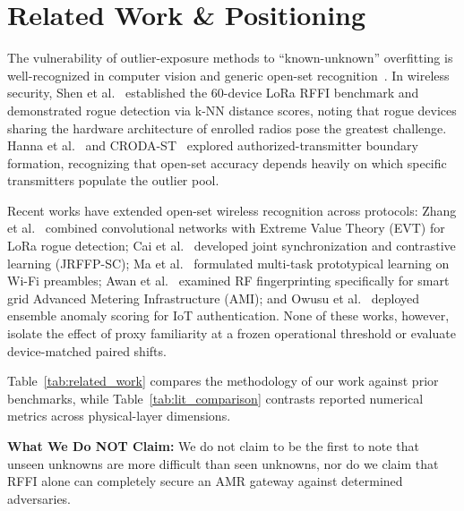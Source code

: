 \documentclass[conference]{IEEEtran}
\begin{document}
\section{Related Work \& Positioning}
The vulnerability of outlier-exposure methods to ``known-unknown'' overfitting is well-recognized in computer vision and generic open-set recognition~\cite{kong2021opengan,koch2023lord}. In wireless security, Shen et al.~\cite{shen2022lora} established the 60-device LoRa RFFI benchmark and demonstrated rogue detection via k-NN distance scores, noting that rogue devices sharing the hardware architecture of enrolled radios pose the greatest challenge. Hanna et al.~\cite{hanna2021open} and CRODA-ST~\cite{crodast2026} explored authorized-transmitter boundary formation, recognizing that open-set accuracy depends heavily on which specific transmitters populate the outlier pool.

Recent works have extended open-set wireless recognition across protocols: Zhang et al.~\cite{zhang2024lora} combined convolutional networks with Extreme Value Theory (EVT) for LoRa rogue detection; Cai et al.~\cite{cai2025jrffp} developed joint synchronization and contrastive learning (JRFFP-SC); Ma et al.~\cite{ma2025mtpl} formulated multi-task prototypical learning on Wi-Fi preambles; Awan et al.~\cite{awan2023rf} examined RF fingerprinting specifically for smart grid Advanced Metering Infrastructure (AMI); and Owusu et al.~\cite{owusu2026ensemble} deployed ensemble anomaly scoring for IoT authentication. None of these works, however, isolate the effect of proxy familiarity at a frozen operational threshold or evaluate device-matched paired shifts.

Table~\ref{tab:related_work} compares the methodology of our work against prior benchmarks, while Table~\ref{tab:lit_comparison} contrasts reported numerical metrics across physical-layer dimensions.



\textbf{What We Do NOT Claim:} We do not claim to be the first to note that unseen unknowns are more difficult than seen unknowns, nor do we claim that RFFI alone can completely secure an AMR gateway against determined adversaries.
\end{document}
